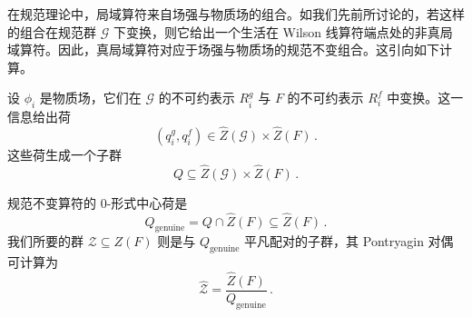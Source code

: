 在规范理论中，局域算符来自场强与物质场的组合。如我们先前所讨论的，若这样的组合在规范群 $\mathcal{G}$ 下变换，则它给出一个生活在 Wilson 线算符端点处的非真局域算符。因此，真局域算符对应于场强与物质场的规范不变组合。这引向如下计算。

设 $\phi_i$ 是物质场，它们在 $\mathcal{G}$ 的不可约表示 $R_i^g$ 与 $F$ 的不可约表示 $R_i^f$ 中变换。这一信息给出荷
\begin{equation}
  \left(q_i^g,q_i^f\right)\in\widehat{Z}(\mathcal{G})\times\widehat{Z}(F)\,. \tag{5.46}
\end{equation}
这些荷生成一个子群
\begin{equation}
  Q\subseteq\widehat{Z}(\mathcal{G})\times\widehat{Z}(F)\,. \tag{5.47}
\end{equation}


规范不变算符的 0-形式中心荷是
\begin{equation}
  Q_{\mathrm{genuine}}=Q\cap\widehat{Z}(F)\subseteq\widehat{Z}(F)\,. \tag{5.48}
\end{equation}
我们所要的群 $\mathcal{Z}\subseteq Z(F)$ 则是与 $Q_{\mathrm{genuine}}$ 平凡配对的子群，其 Pontryagin 对偶可计算为
\begin{equation}
  \widehat{\mathcal{Z}}=\frac{\widehat{Z}(F)}{Q_{\mathrm{genuine}}}\,. \tag{5.49}
\end{equation}


